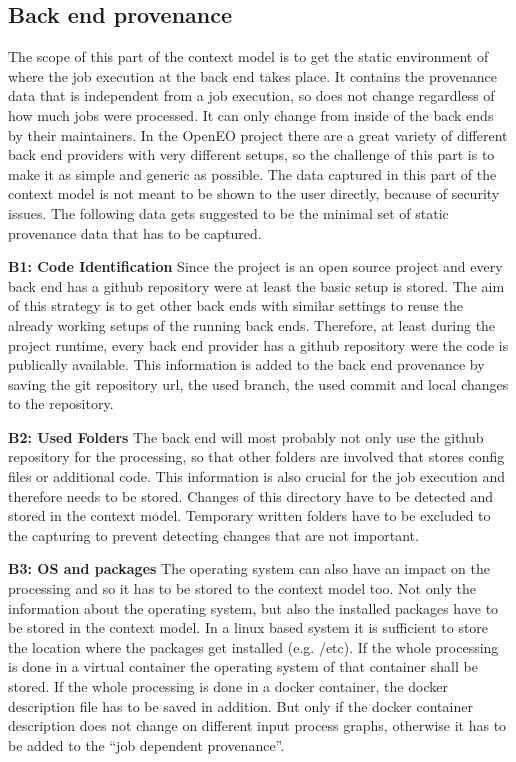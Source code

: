 \documentclass[draft,final]{vutinfth} %
\begin{document}
\subsection{Back end provenance}\label{Design:Back end provenance}
The scope of this part of the context model is to get the static environment of where the job execution at the back end takes place. It contains the provenance data that is independent from a job execution, so does not change regardless of how much jobs were processed. It can only change from inside of the back ends by their maintainers. In the OpenEO project there are a great variety of different back end providers with very different setups, so the challenge of this part is to make it as simple and generic as possible. The data captured in this part of the context model is not meant to be shown to the user directly, because of security issues. The following data gets suggested to be the minimal set of static provenance data that has to be captured. 

\textbf{B1: Code Identification}
Since the project is an open source project and every back end has a github repository were at least the basic setup is stored. The aim of this strategy is to get other back ends with similar settings to reuse the already working setups of the running back ends.  Therefore, at least during the project runtime, every back end provider has a github repository were the code is publically available. This information is added to the back end provenance by saving the git repository url, the used branch, the used commit and local changes to the repository.   

\textbf{B2: Used Folders}
The back end will most probably not only use the github repository for the processing, so that other folders are involved that stores config files or additional code. This information is also crucial for the job execution and therefore needs to be stored. Changes of this directory have to be detected and stored in the context model. Temporary written folders have to be excluded to the capturing to prevent detecting changes that are not important.    

\textbf{B3: OS and packages}
The operating system can also have an impact on the processing and so it has to be stored to the context model too. Not only the information about the operating system, but also the installed packages have to be stored in the context model. In a linux based system it is sufficient to store the location where the packages get installed (e.g. /etc). If the whole processing is done in a virtual container the operating system of that container shall be stored. If the whole processing is done in a docker container, the docker description file has to be saved in addition. But only if the docker container description does not change on different input process graphs, otherwise it has to be added to the “job dependent provenance”. 
\end{document}
